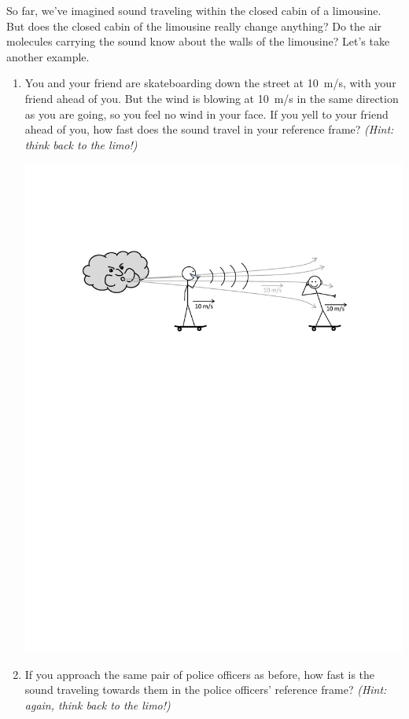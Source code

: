 So far, we've imagined sound traveling within the closed cabin of a limousine.  But does the closed cabin of the limousine really change anything?  Do the air molecules carrying the sound know about the walls of the limousine?  Let's take another example.
\begin{enumerate}[labparts]

\item You and your friend are skateboarding down the street at 10~m/s, with your friend ahead of you.  But the wind is blowing at 10~m/s in the same direction as you are going, so you feel no wind in your face.  If you yell to your friend ahead of you, how fast does the sound travel in your reference frame? \textit{(Hint: think back to the limo!)}

\includegraphics[scale=0.6]{sound_vs_baseballs/skateboarders1.pdf}

\item If you approach the same pair of police officers as before, how fast is the sound traveling towards them in the police officers' reference frame? \textit{(Hint: again, think back to the limo!)}


\end{enumerate}

